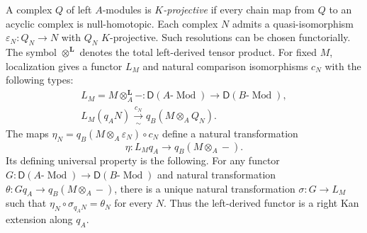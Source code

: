\documentclass[11pt]{article}
\numberwithin{equation}{section}
\theoremstyle{definition}
\theoremstyle{remark}
\newcommand{\D}{\mathsf D}
\newcommand{\otL}{\otimes^{\mathbf L}}
\DeclareMathOperator{\Mod}{Mod}
\begin{document}
A complex $Q$ of left $A$-modules is \emph{$K$-projective} if every
chain map from $Q$ to an acyclic complex is null-homotopic.  Each
complex $N$ admits a quasi-isomorphism
$\varepsilon_N:Q_N\to N$ with $Q_N$ $K$-projective.  Such
resolutions can be chosen functorially.  The symbol $\otL$ denotes
the total left-derived tensor product.  For fixed $M$, localization
gives a functor $L_M$ and natural comparison isomorphisms $c_N$
with the following types:
\[
 \begin{gathered}
 L_M=M\otL_A-:\D(A\text{-}\Mod)\longrightarrow
                  \D(B\text{-}\Mod),\\
 L_M(q_A N)\xrightarrow[\sim]{\,c_N\,}q_B(M\otimes_A Q_N).
 \end{gathered}
\]
The maps
$\eta_N=q_B(M\otimes_A\varepsilon_N)\circ c_N$ define a natural
transformation
\[
 \eta:L_Mq_A\longrightarrow q_B(M\otimes_A-).
\]
Its defining universal property is the following.  For any functor
$G:\D(A\text{-}\Mod)\to\D(B\text{-}\Mod)$ and natural
transformation $\theta:Gq_A\to q_B(M\otimes_A-)$, there is a
unique natural transformation $\sigma:G\to L_M$ such that
$\eta_N\circ\sigma_{q_A N}=\theta_N$ for every $N$.  Thus the
left-derived functor is a right Kan extension along $q_A$.
\end{document}
